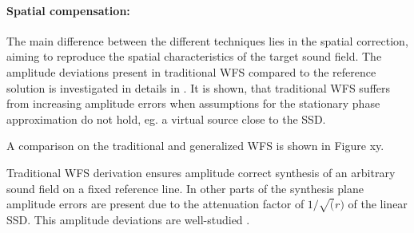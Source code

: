 \vspace{3mm}
\paragraph{Spatial compensation:}
The main difference between the different techniques lies in the spatial correction, aiming to reproduce the spatial characteristics of the target sound field. The amplitude deviations present in traditional WFS compared to the reference solution is investigated in details in \cite{Spors10ahrens:analysis}. It is shown, that traditional WFS suffers from increasing amplitude errors when assumptions for the stationary phase approximation do not hold, eg. a virtual source close to the SSD.

A comparison on the traditional and generalized WFS is shown in Figure xy.

Traditional WFS derivation ensures amplitude correct synthesis of an arbitrary sound field on a fixed reference line. In other parts of the synthesis plane amplitude errors are present due to the attenuation factor of $1/\sqrt(r)$ of the linear SSD. This amplitude deviations are well-studied \cite{Spors10ahrens:analysis, Verheijen1997}.

